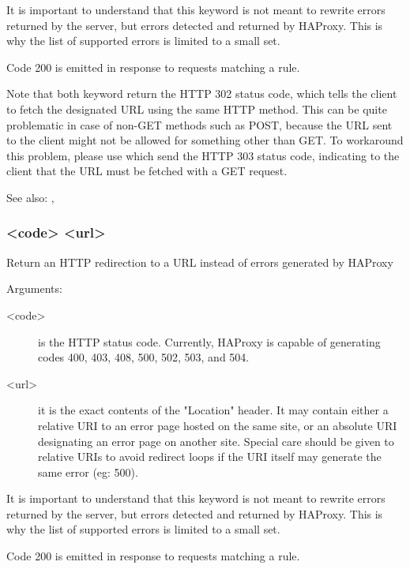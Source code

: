   It is important to understand that this keyword is not meant to rewrite
  errors returned by the server, but errors detected and returned by HAProxy.
  This is why the list of supported errors is limited to a small set.

  Code 200 is emitted in response to requests matching a  rule.

  Note that both keyword return the HTTP 302 status code, which tells the
  client to fetch the designated URL using the same HTTP method. This can be
  quite problematic in case of non-GET methods such as POST, because the URL
  sent to the client might not be allowed for something other than GET. To
  workaround this problem, please use  which send the HTTP 303
  status code, indicating to the client that the URL must be fetched with a GET
  request.

  See also: , 

\subsubsection[errorloc303]{ <code> <url>}

  Return an HTTP redirection to a URL instead of errors generated by HAProxy
  
  
  Arguments:
  \begin{description}
  \item[<code>]
              is the HTTP status code. Currently, HAProxy is capable of
              generating codes 400, 403, 408, 500, 502, 503, and 504.

  \item[<url>]
              it is the exact contents of the "Location" header. It may contain
              either a relative URI to an error page hosted on the same site,
              or an absolute URI designating an error page on another site.
              Special care should be given to relative URIs to avoid redirect
              loops if the URI itself may generate the same error (eg: 500).
  \end{description}

  It is important to understand that this keyword is not meant to rewrite
  errors returned by the server, but errors detected and returned by HAProxy.
  This is why the list of supported errors is limited to a small set.

  Code 200 is emitted in response to requests matching a  rule.

